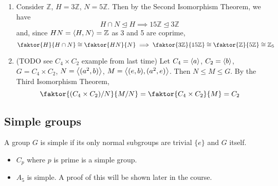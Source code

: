 \begin{example}
	\begin{enumerate}
		\item Consider \(\mathbb Z\), \(H = 3 \mathbb Z\), \(N = 5 \mathbb Z\).
			  Then by the Second Isomorphism Theorem, we have
			  \[
				  H \cap N \trianglelefteq H \implies 15\mathbb Z \trianglelefteq 3\mathbb Z
			  \]
			  and, since \(HN = \left\langle{} H, N \right\rangle = \mathbb Z\) as 3 and 5 are coprime,
			  \[
				  \faktor{H}{H \cap N} \cong \faktor{HN}{N} \implies \faktor{3\mathbb Z}{15\mathbb Z} \cong \faktor{\mathbb Z}{5\mathbb Z} \cong \mathbb Z_5
			  \]
		\item (TODO see \(C_4 \times C_2\) example from last time) Let \(C_4 = \left\langle{} a \right\rangle\), \(C_2 = \left\langle{} b \right\rangle\), \(G = C_4 \times C_2\), \(N = \left\langle{} (a^2, b) \right\rangle\), \(M = \left\langle{} (e, b), (a^2, e) \right\rangle\).
			  Then \(N \leq M \leq G\).
			  By the Third Isomorphism Theorem,
			  \[
				  \faktor{(C_4 \times C_2) / N}{M / N} = \faktor{C_4 \times C_2}{M} = C_2
			  \]
	\end{enumerate}
\end{example}

\subsection{Simple groups}
\begin{definition}
	A group \(G\) is simple if its only normal subgroups are trivial \(\{ e \}\) and \(G\) itself.
\end{definition}
\begin{itemize}
	\item \(C_p\) where \(p\) is prime is a simple group.
	\item \(A_5\) is simple.
	      A proof of this will be shown later in the course.
\end{itemize}
